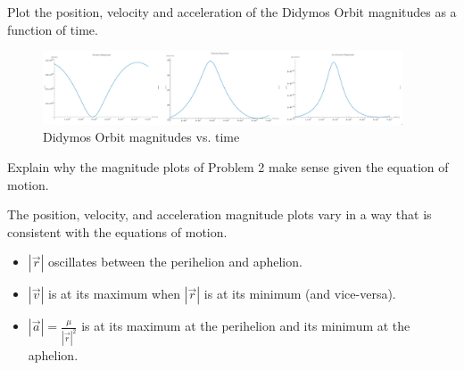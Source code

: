 \begin{hwkProblem}{2}{}

	Plot the position, velocity and acceleration of the Didymos Orbit magnitudes as a function of time.

	\hwkSol

	\hwkPart

	\begin{figure}[ht]
		\begin{center}
			\includegraphics[width=0.95\textwidth]{./images/s02.png}
		\end{center}
		\caption{Didymos Orbit magnitudes vs. time}\label{fig:s02}
	\end{figure}

	\hwkPart
	
	

\end{hwkProblem}

\begin{hwkProblem}{3}{}

	Explain why the magnitude plots of Problem 2 make sense given the equation of motion.

	\hwkSol

	The position, velocity, and acceleration magnitude plots vary in a way that is consistent with the equations of motion.
	\begin{itemize}
		\item \( \left| \vec{r} \right| \) oscillates between the perihelion and aphelion.
		\item \( \left| \vec{v} \right| \) is at its maximum when \( \left| \vec{r} \right| \) is at its minimum (and vice-versa).
		\item \( \left| \vec{a} \right| = \frac{\mu}{{\left| \vec{r} \right|}^{2}} \) is at its maximum at the perihelion and its minimum at the aphelion.
	\end{itemize}

\end{hwkProblem}

